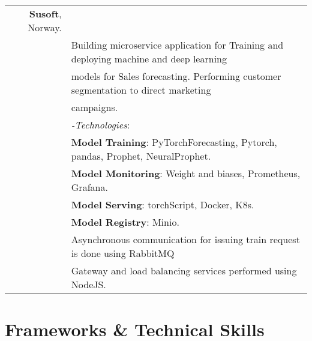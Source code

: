 \documentclass[a4paper,10pt]{article}
\begin{document}
\begin{tabular}{r|l}
    \textbf{Susoft}, Norway. \\& 
    Building microservice application for Training and deploying machine and deep learning \\& models for Sales forecasting. 
    Performing customer segmentation to direct marketing \\& campaigns. \\&
    \textit{-Technologies}:\\&
     \textbf{Model Training}: PyTorchForecasting, Pytorch, pandas, Prophet, NeuralProphet. \\&
     \textbf{Model Monitoring}: Weight and biases, Prometheus, Grafana.\\&
     \textbf{Model Serving}: torchScript, Docker, K8s. \\&
     \textbf{Model Registry}: Minio. \\&
    Asynchronous communication for issuing train request is done using RabbitMQ \\&
    Gateway and load balancing services performed using NodeJS. 
\\
\end{tabular}
\newpage
\section{\textbf{Frameworks \& Technical Skills}}
\end{document}
